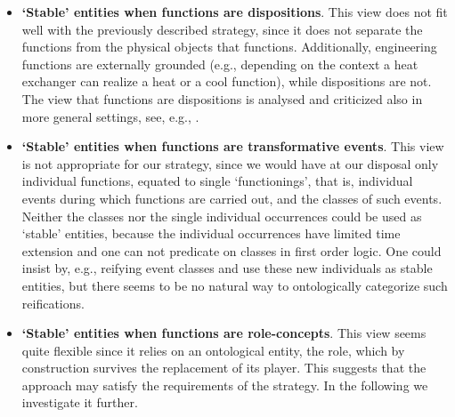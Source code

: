 \documentclass[
]{ceurart}
\begin{document}
\begin{itemize}
  \item \textbf{`Stable' entities when functions are dispositions}. This view does not fit well with the previously described strategy, since it does not separate the functions from the physical objects that functions. Additionally, engineering functions are externally grounded (e.g., depending on the context a heat exchanger can realize a heat or a cool function), while dispositions are not. The view that functions are dispositions is analysed and criticized also in more general settings, see, e.g., \cite{rohlWhyFunctionsAre2014}. %
  \item \textbf{`Stable' entities when functions are transformative events}. %
   This view is not appropriate  %
   for our strategy, since we would have at our disposal only individual functions, equated to single `functionings', that is, individual events during which functions are carried out, and the classes of such events. Neither the classes nor the single individual occurrences could be used as `stable' entities, because the individual occurrences have limited time extension and one can not predicate on classes in first order logic.
   One could insist by, e.g., reifying event classes and use these new individuals as stable entities, but there seems to be no natural way to ontologically categorize such reifications. %
  \item \textbf{`Stable' entities when functions are role-concepts}. This view seems quite flexible since it relies on an ontological entity, the role, which by construction survives the replacement of its player. This suggests that the approach may satisfy the requirements of the strategy. In the following we investigate it further.
\end{itemize}
\end{document}
